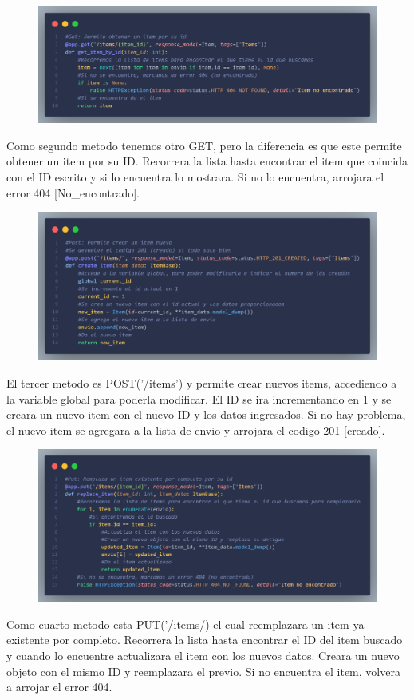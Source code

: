 \documentclass[12pt]{article}
\begin{document}
\begin{figure}[H]
    \centering
    \includegraphics[width=1\textwidth]{Imagenes/Captura6_getindividual.png}
\end{figure}
Como segundo metodo tenemos otro GET, pero la diferencia es que este permite obtener un item por su ID.
Recorrera la lista hasta encontrar el item que coincida con el ID escrito y si lo encuentra lo mostrara.
Si no lo encuentra, arrojara el error 404 [No\_encontrado].

\begin{figure}[H]
    \centering
    \includegraphics[width=1\textwidth]{Imagenes/Captura7_post.png}
\end{figure}
El tercer metodo es POST('/items') y permite crear nuevos items, accediendo a la variable global para poderla modificar.
El ID se ira incrementando en 1 y se creara un nuevo item con el nuevo ID y los datos ingresados.
Si no hay problema, el nuevo item se agregara a la lista de envio y arrojara el codigo 201 [creado].

\begin{figure}[H]
    \centering
    \includegraphics[width=1\textwidth]{Imagenes/Captura8_put.png}
\end{figure}
Como cuarto metodo esta PUT('/items/) el cual reemplazara un item ya existente por completo.
Recorrera la lista hasta encontrar el ID del item buscado y cuando lo encuentre actualizara el item con los nuevos datos.
Creara un nuevo objeto con el mismo ID y reemplazara el previo.
Si no encuentra el item, volvera a arrojar el error 404.
\end{document}
